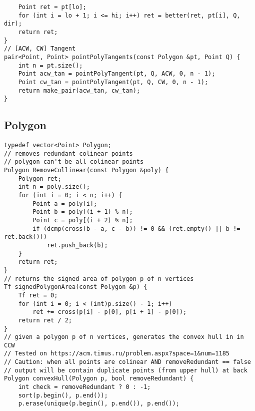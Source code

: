 \documentclass[FSZ,a4paper,onesided]{article}
\begin{document}
\begin{multicols*}{\COLS}
\begin{lstlisting}
    Point ret = pt[lo];
    for (int i = lo + 1; i <= hi; i++) ret = better(ret, pt[i], Q, dir);
    return ret;
}
// [ACW, CW] Tangent
pair<Point, Point> pointPolyTangents(const Polygon &pt, Point Q) {
    int n = pt.size();
    Point acw_tan = pointPolyTangent(pt, Q, ACW, 0, n - 1);
    Point cw_tan = pointPolyTangent(pt, Q, CW, 0, n - 1);
    return make_pair(acw_tan, cw_tan);
}
\end{lstlisting}
\subsection{Polygon}
\begin{lstlisting}
typedef vector<Point> Polygon;
// removes redundant colinear points
// polygon can't be all colinear points
Polygon RemoveCollinear(const Polygon &poly) {
    Polygon ret;
    int n = poly.size();
    for (int i = 0; i < n; i++) {
        Point a = poly[i];
        Point b = poly[(i + 1) % n];
        Point c = poly[(i + 2) % n];
        if (dcmp(cross(b - a, c - b)) != 0 && (ret.empty() || b != ret.back()))
            ret.push_back(b);
    }
    return ret;
}
// returns the signed area of polygon p of n vertices
Tf signedPolygonArea(const Polygon &p) {
    Tf ret = 0;
    for (int i = 0; i < (int)p.size() - 1; i++)
        ret += cross(p[i] - p[0], p[i + 1] - p[0]);
    return ret / 2;
}
// given a polygon p of n vertices, generates the convex hull in in CCW
// Tested on https://acm.timus.ru/problem.aspx?space=1&num=1185
// Caution: when all points are colinear AND removeRedundant == false
// output will be contain duplicate points (from upper hull) at back
Polygon convexHull(Polygon p, bool removeRedundant) {
    int check = removeRedundant ? 0 : -1;
    sort(p.begin(), p.end());
    p.erase(unique(p.begin(), p.end()), p.end());


\end{lstlisting}
\end{multicols*}
\end{document}
